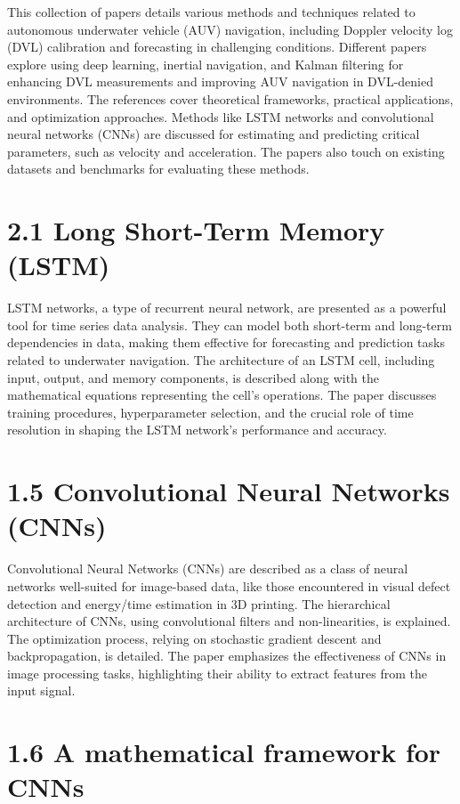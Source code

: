 \documentclass{article}
\begin{document}
This collection of papers details various methods and techniques related to autonomous underwater vehicle (AUV) navigation, including Doppler velocity log (DVL) calibration and forecasting in challenging conditions.  Different papers explore using deep learning, inertial navigation, and Kalman filtering for enhancing DVL measurements and improving AUV navigation in DVL-denied environments.  The references cover theoretical frameworks, practical applications, and optimization approaches.  Methods like LSTM networks and convolutional neural networks (CNNs) are discussed for estimating and predicting critical parameters, such as velocity and acceleration.  The papers also touch on existing datasets and benchmarks for evaluating these methods.


\section*{2.1 Long Short-Term Memory (LSTM)}

LSTM networks, a type of recurrent neural network, are presented as a powerful tool for time series data analysis.  They can model both short-term and long-term dependencies in data, making them effective for forecasting and prediction tasks related to underwater navigation.  The architecture of an LSTM cell, including input, output, and memory components, is described along with the mathematical equations representing the cell's operations.  The paper discusses training procedures, hyperparameter selection, and the crucial role of time resolution in shaping the LSTM network's performance and accuracy.


\section*{1.5 Convolutional Neural Networks (CNNs)}

Convolutional Neural Networks (CNNs) are described as a class of neural networks well-suited for image-based data, like those encountered in visual defect detection and energy/time estimation in 3D printing.  The hierarchical architecture of CNNs, using convolutional filters and non-linearities, is explained.  The optimization process, relying on stochastic gradient descent and backpropagation, is detailed. The paper emphasizes the effectiveness of CNNs in image processing tasks, highlighting their ability to extract features from the input signal.


\section*{1.6 A mathematical framework for CNNs}
\end{document}
